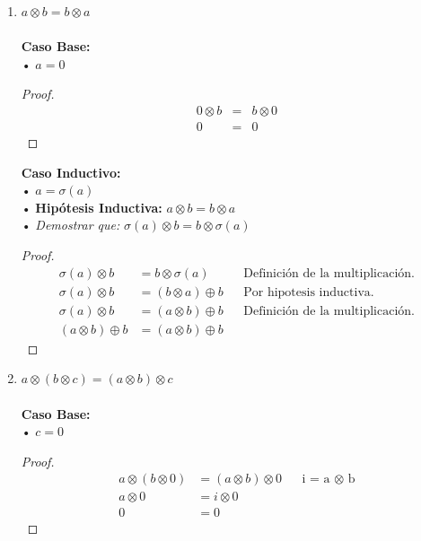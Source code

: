 \documentclass[11pt,letterpaper]{article}
\begin{document}
\begin{enumerate}
\item{$a \otimes b = b \otimes a$} \\
\\
\noindent \textbf{\large Caso Base:} \\
\noindent • $a=0$
\begin{proof}
\begin{eqnarray*}
0 \otimes b &=& b \otimes 0 \\
0 &=& 0
\end{eqnarray*}
\end{proof}

\vspace{0.1cm}

\noindent \textbf{\large Caso Inductivo:}\\
\noindent • $a=\sigma(a)$ \\
\noindent • \textbf{Hipótesis Inductiva: } $a \otimes b = b \otimes a$ \\
\noindent • \emph{Demostrar que:} $\sigma(a) \otimes b = b \otimes \sigma(a)$

\begin{proof}
\begin{align}
\sigma(a) \otimes b &= b \otimes \sigma(a) && \text{Definición de la multiplicación.}\\
\sigma(a) \otimes b &= (b \otimes a) \oplus b && \text{Por hipotesis inductiva.} \\
\sigma(a) \otimes b &= (a \otimes b) \oplus b && \text{Definición de la multiplicación.}\\
(a \otimes b) \oplus b &= (a \otimes b) \oplus b
\end{align}
\end{proof}
\pagebreak

\item{$a \otimes (b \otimes c)=(a\otimes b)\otimes c$} \\
\\
\noindent \textbf{\large Caso Base:}\\
\noindent • $c=0$
\begin{proof}
\begin{align*}
a \otimes (b \otimes 0) &= (a \otimes b) \otimes 0 && \text{i\ =\ a $\otimes$ b}\\
a \otimes 0 &= i \otimes 0 \\
0 &= 0
\end{align*}
\end{proof}


\end{enumerate}
\end{document}
